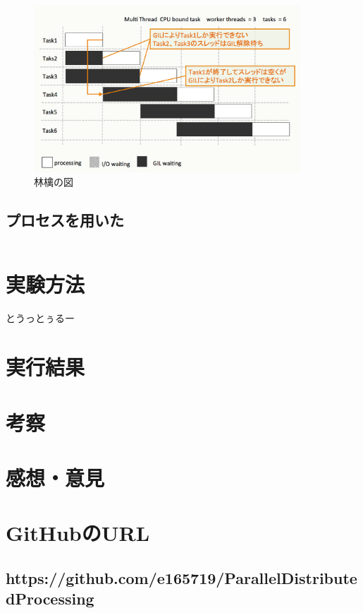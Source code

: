 \documentclass[14pt, oneside]{article}     	%
\begin{document}
\begin{figure}[h]
  \centering
  \includegraphics[width=10cm]{multithred_cpubound.png}
  \caption{林檎の図}
\end{figure}

\subsection{プロセスを用いた}

\begin{lstlisting}[caption=シンプレクス法プログラム]

\end{lstlisting}

\section{実験方法}
とうっとぅるー

\section{実行結果}




\section{考察}






\section{感想・意見}
\section*{GitHubのURL}

\subsection*{https://github.com/e165719/ParallelDistributedProcessing}
\end{document}
